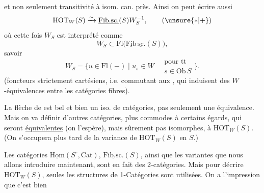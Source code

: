 et non seulement transitivité à isom. can. près.
Ainsi on peut écrire aussi
\[
\mathrm{HOT}_W(S)\xrightarrow{\sim}\underline{\mathrm{Fib.sc.}}(S)W_S^{-1},\tag*{($\unsure{*|+}$)}
\]
où cette fois $W_S$ est interprété comme
\[
W_S\subset\mathrm{Fl}\bigl(\underline{\mathrm{Fib}}\,\underline{\mathrm{sc}}.(S)\bigr),
\]
savoir
\[
W_S=\{u\in\mathrm{Fl}(-)\mid u_s\in W\quad\substack{\text{pour tt}\\s\in\mathrm{Ob}\,S}\}.
\]
(foncteurs strictement cartésiens, i.e. commutant
aux , qui induisent des $W$-équivalences
entre les catégories fibres).

La flèche de  est bel et bien un iso.
de catégories, pas seulement une équivalence.
Mais on va définir d'autres catégories, plus
commodes à certains égards, qui seront
\uline{équivalentes} (on l'espère), mais sûrement
pas isomorphes, à $\mathrm{HOT}_W(S)$. (On s'occupera
plus tard de la variance de $\mathrm{HOT}_W(S)$ en $S$.)

Les catégories $\underline{\mathrm{Hom}}(S^\circ,\mathrm{Cat})$, $\underline{\mathrm{Fib.sc.}}(S)$,
ainsi que les variantes que nous allons
introduire maintenant, sont en fait des
2-catégories. Mais pour décrire $\mathrm{HOT}_W(S)$,
seules les structures de 1-Catégories sont utilisées. On a l'impression que c'est bien

